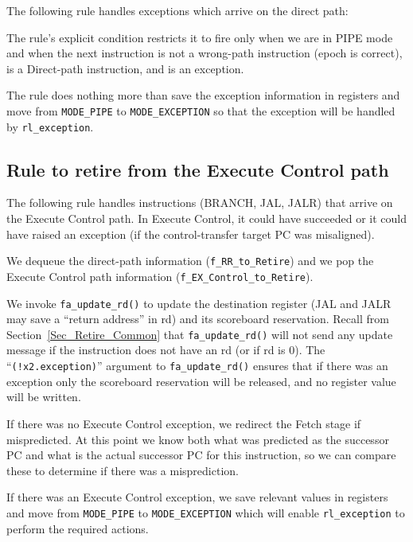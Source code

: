 The following rule handles exceptions which arrive on the direct path:



The rule's explicit condition restricts it to fire only when we are in
PIPE mode and when the next instruction is not a wrong-path
instruction (epoch is correct), is a Direct-path instruction, and is
an exception.

The rule does nothing more than save the exception information in
registers and move from \verb|MODE_PIPE| to \verb|MODE_EXCEPTION| so
that the exception will be handled by \verb|rl_exception|.


\subsection{Rule to retire from the Execute Control path}

\label{Sec_Fife_Retire_Control}

The following rule handles instructions (BRANCH, JAL, JALR) that
arrive on the Execute Control path.  In Execute Control, it could have
succeeded or it could have raised an exception (if the
control-transfer target PC was misaligned).



We dequeue the direct-path information (\verb|f_RR_to_Retire|) and we
pop the Execute Control path information
(\verb|f_EX_Control_to_Retire|).

We invoke \verb|fa_update_rd()| to update the destination register
(JAL and JALR may save a ``return address'' in rd) and its scoreboard
reservation.  Recall from Section~\ref{Sec_Retire_Common} that
\verb|fa_update_rd()| will not send any update message if the
instruction does not have an rd (or if rd is 0).  The
``\verb|(!x2.exception)|'' argument to \verb|fa_update_rd()| ensures
that if there was an exception only the scoreboard reservation will be
released, and no register value will be written.

If there was no Execute Control exception, we redirect the Fetch stage
if mispredicted.  At this point we know both what was predicted as the
successor PC and what is the actual successor PC for this instruction,
so we can compare these to determine if there was a misprediction.

If there was an Execute Control exception, we save relevant values in
registers and move from \verb|MODE_PIPE| to \verb|MODE_EXCEPTION|
which will enable \verb|rl_exception| to perform the required actions.

